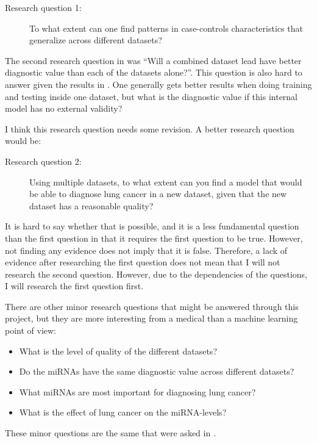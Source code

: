 \begin{description}
    \item[Research question 1:] To what extent can one find patterns in case-controls characteristics that generalize across different datasets?
\end{description}

The second research question in \citet{forprosjekt} was ``Will a combined dataset lead have better diagnostic value than each of the datasets alone?''. This question is also hard to answer given the results in \citet{forprosjekt}. One generally gets better results when doing training and testing inside one dataset, but what is the diagnostic value if this internal model has no external validity?

I think this research question needs some revision. A better research question would be:

\begin{description}
    \item[Research question 2:] Using multiple datasets, to what extent can you find a model that would be able to diagnose lung cancer in a new dataset, given that the new dataset has a reasonable quality?
\end{description}

It is hard to say whether that is possible, and it is a less fundamental question than the first question in that it requires the first question to be true. However, not finding any evidence does not imply that it is false. Therefore, a lack of evidence after researching the first question does not mean that I will not research the second question. However, due to the dependencies of the questions, I will research the first question first.

There are other minor research questions that might be answered through this project, but they are more interesting from a medical than a machine learning point of view:
\begin{itemize}
    \item What is the level of quality of the different datasets?
    \item Do the miRNAs have the same diagnostic value across different datasets?
    \item What miRNAs are most important for diagnosing lung cancer?
    \item What is the effect of lung cancer on the miRNA-levels?
\end{itemize}
These minor questions are the same that were asked in \citet{forprosjekt}.

